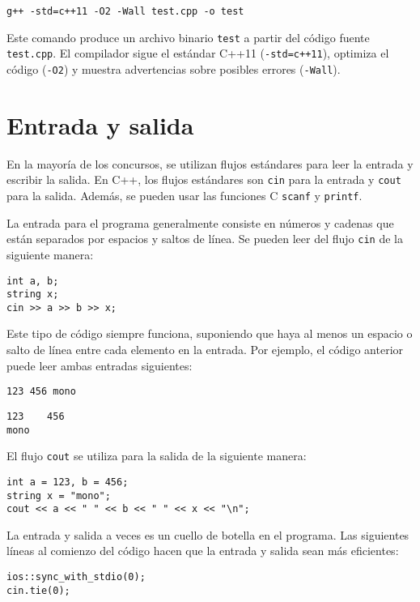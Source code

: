 \begin{lstlisting}
g++ -std=c++11 -O2 -Wall test.cpp -o test
\end{lstlisting}

Este comando produce un archivo binario \texttt{test}
a partir del código fuente \texttt{test.cpp}.
El compilador sigue el estándar C++11
(\texttt{-std=c++11}),
optimiza el código (\texttt{-O2})
y muestra advertencias sobre posibles errores (\texttt{-Wall}).

\section{Entrada y salida}


En la mayoría de los concursos, se utilizan flujos estándares
para leer la entrada y escribir la salida.
En C++, los flujos estándares son
\texttt{cin} para la entrada y \texttt{cout} para la salida.
Además, se pueden usar las funciones C
\texttt{scanf} y \texttt{printf}.

La entrada para el programa generalmente consiste en
números y cadenas que están separados por
espacios y saltos de línea.
Se pueden leer del flujo \texttt{cin}
de la siguiente manera:

\begin{lstlisting}
int a, b;
string x;
cin >> a >> b >> x;
\end{lstlisting}

Este tipo de código siempre funciona,
suponiendo que haya al menos un espacio
o salto de línea entre cada elemento en la entrada.
Por ejemplo, el código anterior puede leer
ambas entradas siguientes:
\begin{lstlisting}
123 456 mono
\end{lstlisting}
\begin{lstlisting}
123    456
mono
\end{lstlisting}
El flujo \texttt{cout} se utiliza para la salida
de la siguiente manera:
\begin{lstlisting}
int a = 123, b = 456;
string x = "mono";
cout << a << " " << b << " " << x << "\n";
\end{lstlisting}

La entrada y salida a veces
es un cuello de botella en el programa.
Las siguientes líneas al comienzo del código
hacen que la entrada y salida sean más eficientes:

\begin{lstlisting}
ios::sync_with_stdio(0);
cin.tie(0);
\end{lstlisting}

